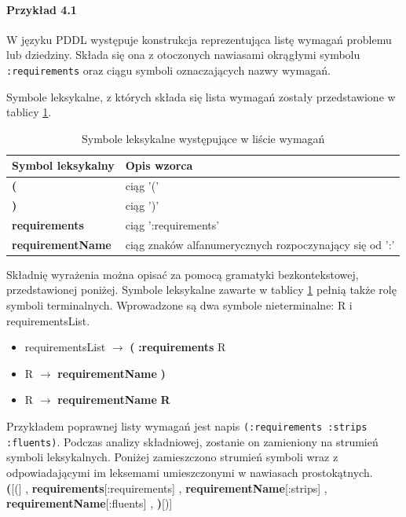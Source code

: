 \paragraph{Przykład 4.1}
W języku PDDL występuje konstrukcja reprezentująca listę wymagań problemu lub dziedziny.
Składa się ona z otoczonych nawiasami okrągłymi symbolu \texttt{:requirements} oraz
ciągu symboli oznaczających nazwy wymagań. 

Symbole leksykalne, z których składa się lista wymagań zostały przedstawione w tablicy
\ref{ana_lextable}.

\begin{table}[h]
  \centering
  \caption{Symbole leksykalne występujące w liście wymagań}
  \begin{tabular}{|l|l|}
    \hline
    Symbol leksykalny & Opis wzorca \\ \hline
    \textbf{(} & ciąg '(' \\ 
    \textbf{)} & ciąg ')' \\ 
    \textbf{requirements} & ciąg ':requirements' \\
    \textbf{requirementName} & ciąg znaków alfanumerycznych rozpoczynający się od ':' \\
    \hline
  \end{tabular}
  \label{ana_lextable}
\end{table}

Składnię wyrażenia można opisać za pomocą gramatyki bezkontekstowej, przedstawionej
poniżej. Symbole leksykalne zawarte w tablicy \ref{ana_lextable} pełnią także rolę symboli terminalnych.
Wprowadzone są dwa symbole nieterminalne: R i requirementsList.

\begin{itemize}
\item requirementsList $\rightarrow$ \textbf{(} \textbf{:requirements} R
\item R $\rightarrow$ \textbf{requirementName} \textbf{)}
\item R $\rightarrow$ \textbf{requirementName} \textbf{R}
\end{itemize}

Przykładem poprawnej listy wymagań jest napis \texttt{(:requirements :strips :fluents)}.
Podczas analizy składniowej, zostanie on zamieniony na strumień symboli leksykalnych.
Poniżej zamieszczono strumień symboli wraz z odpowiadającymi im leksemami umieszczonymi 
w nawiasach prostokątnych.\\
\textbf{(}[(] , \textbf{requirements}[:requirements] , \textbf{requirementName}[:strips] , \\
\textbf{requirementName}[:fluents] , \textbf{)}[)]

